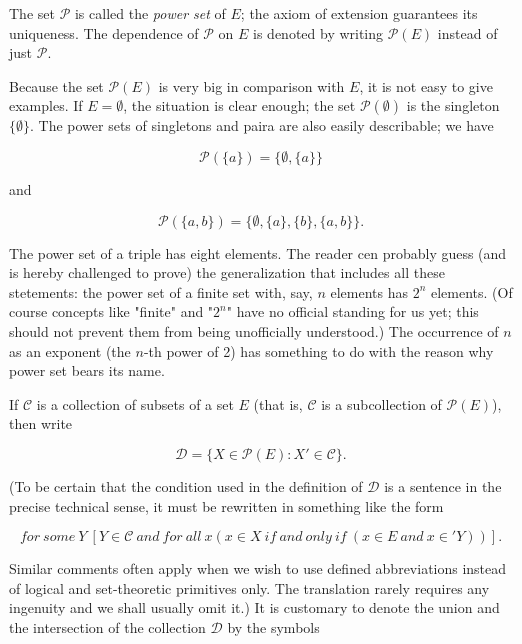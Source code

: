 The set $ \mathcal{P} $ is called the \textit{power set} of $E$; the axiom of extension guarantees its uniqueness. The dependence of $ \mathcal{P} $ on $E$ is denoted by writing $ \mathcal{P} (E) $ instead of just $ \mathcal{P} $.

Because the set $ \mathcal{P} (E) $ is very big in comparison with $E$, it is not easy to give examples. If $E = \emptyset $, the situation is clear enough; the set $ \mathcal{P} ( \emptyset ) $ is the singleton $\{ \emptyset \}$. The power sets of singletons and paira are also easily describable; we have 

\begin{equation*}
\mathcal{P} ( \{ a \} ) = \{ \emptyset, \{ a \} \} 
\end{equation*}

and 

\begin{equation*}
\mathcal{P} ( \{ a, b \} ) = \{ \emptyset, \{ a \} , \{ b \} , \{ a,b \} \} .
\end{equation*}

The power set of a triple has eight elements. The reader cen probably guess (and is hereby challenged to prove) the generalization that includes all these stetements: the power set of a finite set with, say, $n$ elements has $2^{n}$ elements. (Of course concepts like "finite" and "$2^{n}$" have no official standing for us yet; this should not prevent them from being unofficially understood.) The occurrence of $n$ as an exponent (the $n$-th power of 2) has something to do with the reason why power set bears its name. 

If $ \mathcal{C} $ is a collection of subsets of a set $E$ (that is, $ \mathcal{C} $ is a subcollection of $ \mathcal{P} (E) $), then write

\begin{equation*}
\mathcal{D} = \{ X \in \mathcal{P} (E): X' \in \mathcal{C} \} .
\end{equation*}

(To be certain that the condition used in the definition of $ \mathcal{D} $ is a sentence in the precise technical sense, it must be rewritten in something like the form 

\begin{equation*}
for \: some \: Y \: [ Y \in \mathcal{C} \: and \: for \: all \: x ( x \in X \: if \: and \: only \: if \: (x \in E \: and \: x \in ' Y)) ] .  
\end{equation*}

Similar comments often apply when we wish to use defined abbreviations instead of logical and set-theoretic primitives only. The translation rarely requires any ingenuity and we shall usually omit it.) It is customary to denote the union and the intersection of the collection $ \mathcal{D} $ by the symbols  


